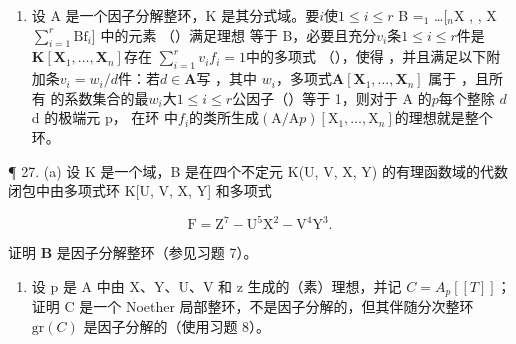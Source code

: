 \begin{enumerate}
\def\labelenumi{\arabic{enumi}.}
\setcounter{enumi}{25}
\tightlist
\item
  设 A 是一个因子分解整环，K 是其分式域。要\(i\)使\(1 \leqslant i \leqslant r\) B {=}\(_{1}\) \ldots[\(_{n}\){}X  , , X  \(\sum_{i=1}^{r} \text{Bf}_i\)] 中的元素 （）满足理想  等于 B，必要且充分\(v_{i}\)条\(1 \leqslant i \leqslant r\)件是\(\mathbf{K}[\mathbf{X}_1, \ldots, \mathbf{X}_n]\)存在  \(\sum_{i=1}^{r} v_i f_i = 1\)中的多项式 （），使得 ，并且满足以下附加条\(v_i = w_i / d\)件：若\(d \in \mathbf{A}\)写 ，其中 \(w_i\)，多项式\(\mathbf{A}[\mathbf{X}_1, \ldots, \mathbf{X}_n]\)  属于 ，且所有  的系数集合的最\(w_i\)大\(1 \leqslant i \leqslant r\)公因子（）等于 1，则对于 A 的\(p\)每个整除 \(d\)d 的极端元 p， 在环  中\(f_i\)的类所生成\((\mathrm{A} / \mathrm{A}p)[\mathrm{X}_1, \ldots, \mathrm{X}_n]\)的理想就是整个环。
\end{enumerate}

¶ 27. (a) 设 K 是一个域，B 是在四个不定元 K(U, V, X, Y) 的有理函数域的代数闭包中由多项式环 K{[}U, V, X, Y{]} 和多项式

\[
\mathrm{F} = \mathrm{Z} ^ {7} - \mathrm{U} ^ {5} \mathrm{X} ^ {2} - \mathrm{V} ^ {4} \mathrm{Y} ^ {3}.
\]

证明 \(\mathbf{B}\) 是因子分解整环（参见习题 7）。

\begin{enumerate}
\def\labelenumi{(\alph{enumi})}
\setcounter{enumi}{1}
\tightlist
\item
  设 p 是 A 中由 X、Y、U、V 和 z 生成的（素）理想，并记 \(C = A_{p}[[T]]\)；证明 C 是一个 Noether 局部整环，不是因子分解的，但其伴随分次整环 \(\text{gr}(C)\) 是因子分解的（使用习题 8）。
\end{enumerate}
\relax{}
